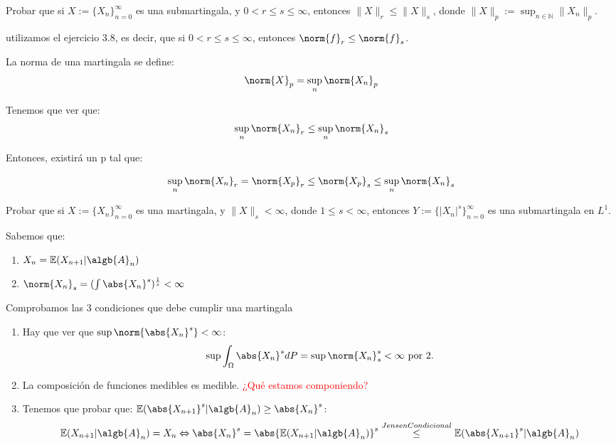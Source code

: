 \begin{problem}[2]  Probar que si $X := \{X_n\}_{n=0}^{\infty}$  es una submartingala, y
$0  <  r\le s\le \infty$, entonces $\|X\|_r  \le \|X\|_s$, donde 
$\|X\|_p := \sup_{n\in \mathbb{N}} \|X_n\|_{p}$. 
\solution

\begin{expla}
utilizamos el ejercicio 3.8, es decir, que si $0<r\leq s \leq \infty$, entonces $\norm{f}_r \leq \norm{f}_s$.

La norma de una martingala se define:
\[
\norm{X}_p = \sup_n \norm{X_n}_p
\]
\end{expla}

Tenemos que ver que:
\[
\sup_n \norm{X_n}_r \leq \sup_n \norm{X_n}_s
\]

Entonces, existirá un p tal que:

\[
\sup_n \norm{X_n}_r  = \norm{X_p}_r \leq \norm{X_p}_s \leq \sup_n \norm{X_n}_s
\]

\end{problem}


\begin{problem}[3] Probar que si $X := \{X_n\}_{n=0}^{\infty}$  es una martingala, y $ \|X\|_s <\infty$, donde 
$1\le s < \infty$, entonces  $Y := \{|X_n|^s\}_{n=0}^{\infty}$  es una submartingala
en $L^1$. 
\solution

\begin{expla}
Sabemos que:
\begin{enumerate}
\item $X_n = \mathbb{E}(X_{n+1}|\algb{A}_n)$
\item $\norm{X_n}_s = (\int \abs{X_n}^s)^{\frac{1}{s}} < \infty$
\end{enumerate} 
\end{expla}
Comprobamos las 3 condiciones que debe cumplir una martingala
\begin{enumerate}
\item Hay que ver que $\sup \norm{\abs{X_n}^s} < \infty$:
\[
\sup \int_{\Omega} \abs{X_n}^s dP =  \sup \norm{X_n}_s^s < \infty \text{ por 2.}
\]
\item La composición de funciones medibles es medible. \textcolor{red}{¿Qué estamos componiendo?}
\item Tenemos que probar que: $\mathbb{E}(\abs{X_{n+1}}^s|\algb{A}_n) \geq \abs{X_n}^s$:
\[
\mathbb{E}(X_{n+1}|\algb{A}_n) = X_n \Leftrightarrow \abs{X_n}^s  = \abs{\mathbb{E}(X_{n+1}|\algb{A}_n)}^s \stackrel{JensenCondicional}{\leq} \mathbb{E}(\abs{X_{n+1}}^s|\algb{A}_n)
\]
\end{enumerate}


\end{problem}

